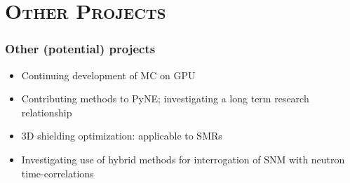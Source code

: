 \documentclass[xcolor=x11names,compress]{beamer}
\renewcommand{\(}{\begin{columns}}
\renewcommand{\)}{\end{columns}}
\newcommand{\<}[1]{\begin{column}{#1}}
\renewcommand{\>}{\end{column}}
\begin{document}
\section{\scshape Other Projects}
\begin{frame}[fragile]
  \frametitle{Other (potential) projects}

  	\begin{itemize}
  	\item Continuing development of MC on GPU
  	\item Contributing methods to PyNE; investigating a long term research relationship 
	\item 3D shielding optimization: applicable to SMRs 
	\item Investigating use of hybrid methods for interrogation of SNM with neutron time-correlations 
	\end{itemize}
	
\end{frame}
\end{document}
